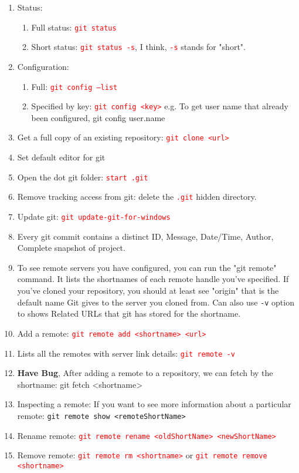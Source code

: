 \documentclass[10 pt]{article}
\newcommand{\R}{\textcolor{red}} %
\newcommand{\T}{\texttt}
\begin{document}
\begin{enumerate}
	\item Status:
		\begin{enumerate}
			\item Full status: \R{\T{git status}}
			\item Short status: \R{\T{git status -s}}, I think, \R{\T{-s}} stands for "short".
		\end{enumerate}
	\item Configuration:
		\begin{enumerate}
			\item Full: \R{\T{git config --list}}
			\item Specified by key: \R{\T{git config <key>}} e.g. To get user name that already been configured, \textcolor{red!70}{{git config user.name}}
		\end{enumerate}
	\item Get a full copy of an existing repository: \R{\T{git clone <url>}}
	
	\item Set default editor for git
	\item Open the dot git folder: \R{\T{start .git}}
	\item Remove tracking access from git: delete the \R{\T{.git}} hidden directory.
	
	\item Update git: \R{\T{git update-git-for-windows}}
	\item Every git commit contains a distinct ID, Message, Date/Time, Author, Complete snapshot of project.
	
	\item To see remote servers you have configured, you can run the "git remote" command. It lists the shortnames of each remote handle you've specified. If you've cloned your repository, you should at least see "origin" that is the default name Git gives to the server you cloned from. Can also use \texttt{-v} option to shows Related URLs that git has stored for the shortname.
	\item Add a remote: \R{\T{git remote add <shortname> <url>}}
	\item Lists all the remotes with server link details: \R{\T{git remote -v}}
	\item \textbf{Have Bug}, After adding a remote to a repository, we can fetch by the shortname: git fetch <shortname>
	\item Inspecting a remote: If you want to see more information about a particular remote: \texttt{git remote show <remoteShortName>}
	\item Rename remote: \R{\T{git remote rename <oldShortName> <newShortName>}}
	\item Remove remote: \R{\T{git remote rm <shortname>}} or \R{\T{git remote remove <shortname>}}
\end{enumerate}
\end{document}
